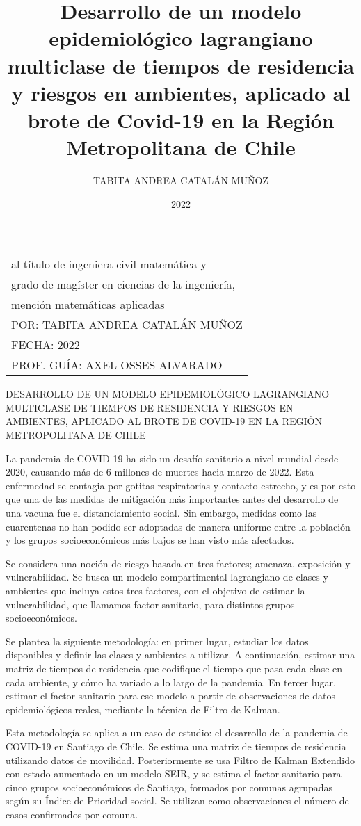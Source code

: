\documentclass[upright, contnum]{umemoria}
\author{TABITA ANDREA CATALÁN MUÑOZ}
\title{Desarrollo de un modelo epidemiológico lagrangiano multiclase de tiempos de residencia y riesgos en ambientes, aplicado al brote de Covid-19 en la Región Metropolitana de Chile}
\date{2022}
\def\tablaresumen {
\begin{tabular}{l}
	\MakeUppercase{RESUMEN DE LA MEMORIA PARA OPTAR \\
	al título de ingeniera civil matemática y \\
	grado de magíster en ciencias de la ingeniería,\\
	mención matemáticas aplicadas}\\
	POR: \MakeUppercase{Tabita Andrea Catalán Muñoz} \\
	FECHA: \MakeUppercase{2022} \\
	PROF. GUÍA: \MakeUppercase{Axel Osses Alvarado}
\end{tabular}
}
\begin{document}
\frontmatter
\maketitle

\begin{flushleft}
	\small
	\tablaresumen
\end{flushleft}

\begin{center}
	\MakeUppercase{Desarrollo de un modelo epidemiológico lagrangiano multiclase de tiempos de residencia y riesgos en ambientes, aplicado al brote de Covid-19 en la Región Metropolitana de Chile}
\end{center}

La pandemia de COVID-19 ha sido un desafío sanitario a nivel mundial desde 2020, causando más de 6 millones de muertes hacia marzo de 2022. Esta enfermedad se contagia por gotitas respiratorias y contacto estrecho, y es por esto que una de las medidas de mitigación más importantes antes del desarrollo de una vacuna fue el distanciamiento social. Sin embargo, medidas como las cuarentenas no han podido ser adoptadas de manera uniforme entre la población y los grupos socioeconómicos más bajos se han visto más afectados.

Se considera una noción de riesgo basada en tres factores; amenaza, exposición y vulnerabilidad. Se busca un modelo compartimental lagrangiano de clases y ambientes que incluya estos tres factores, con el objetivo de estimar la vulnerabilidad, que llamamos factor sanitario, para distintos grupos socioeconómicos.

Se plantea la siguiente metodología: en primer lugar, estudiar los datos disponibles y definir las clases y ambientes a utilizar. A continuación, estimar una matriz de tiempos de residencia que codifique el tiempo que pasa cada clase en cada ambiente, y cómo ha variado a lo largo de la pandemia. En tercer lugar, estimar el factor sanitario para ese modelo a partir de observaciones de datos epidemiológicos reales, mediante la técnica de Filtro de Kalman.

Esta metodología se aplica a un caso de estudio: el desarrollo de la pandemia de COVID-19 en Santiago de Chile. Se estima una matriz de tiempos de residencia utilizando datos de movilidad. Posteriormente se usa Filtro de Kalman Extendido con estado aumentado en un modelo SEIR, y se estima el factor sanitario para cinco grupos socioeconómicos de Santiago, formados por comunas agrupadas según su Índice de Prioridad social. Se utilizan como observaciones el número de casos confirmados por comuna. %
\end{document}
